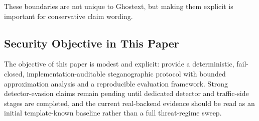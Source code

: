 These boundaries are not unique to Ghostext, but making them explicit is important for conservative claim wording.

\subsection{Security Objective in This Paper}

The objective of this paper is modest and explicit: provide a deterministic, fail-closed, implementation-auditable steganographic protocol with bounded approximation analysis and a reproducible evaluation framework. Strong detector-evasion claims remain pending until dedicated detector and traffic-side stages are completed, and the current real-backend evidence should be read as an initial template-known baseline rather than a full threat-regime sweep.
